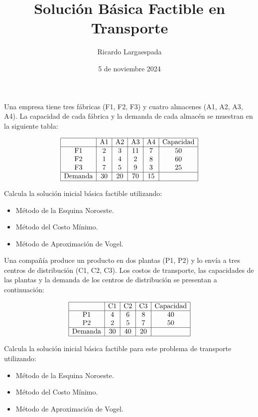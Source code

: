 \documentclass{article}
\title{Solución Básica Factible en Transporte}
\author{Ricardo Largaespada}
\date{5 de noviembre 2024}
\begin{document}
\maketitle

\vspace{-1cm}
\begin{problem}
Una empresa tiene tres fábricas (F1, F2, F3) y cuatro almacenes (A1, A2, A3, A4). La capacidad de cada fábrica y la demanda de cada almacén se muestran en la siguiente tabla:

\[
\begin{array}{|c|c|c|c|c|c|}
\hline
           & \text{A1} & \text{A2} & \text{A3} & \text{A4} & \text{Capacidad} \\
\hline
\text{F1}  & 2  & 3  & 11 & 7  & 50        \\
\text{F2}  & 1  & 4  & 2  & 8  & 60        \\
\text{F3}  & 7  & 5  & 9  & 3  & 25        \\
\hline
\text{Demanda} & 30 & 20 & 70 & 15 &           \\
\hline
\end{array}
\]

Calcula la solución inicial básica factible utilizando:
\begin{itemize}
    \item Método de la Esquina Noroeste.
    \item Método del Costo Mínimo.
    \item Método de Aproximación de Vogel.
\end{itemize}
\end{problem}

\vspace{-.5cm}

\begin{problem}
Una compañía produce un producto en dos plantas (P1, P2) y lo envía a tres centros de distribución (C1, C2, C3). Los costos de transporte, las capacidades de las plantas y la demanda de los centros de distribución se presentan a continuación:

\[
\begin{array}{|c|c|c|c|c|}
\hline
           & \text{C1} & \text{C2} & \text{C3} & \text{Capacidad} \\
\hline
\text{P1}  & 4  & 6  & 8  & 40        \\
\text{P2}  & 2  & 5  & 7  & 50        \\
\hline
\text{Demanda} & 30 & 40 & 20 &           \\
\hline
\end{array}
\]

Calcula la solución inicial básica factible para este problema de transporte utilizando:
\begin{itemize}
    \item Método de la Esquina Noroeste.
    \item Método del Costo Mínimo.
    \item Método de Aproximación de Vogel.
\end{itemize}
\end{problem}
\end{document}
